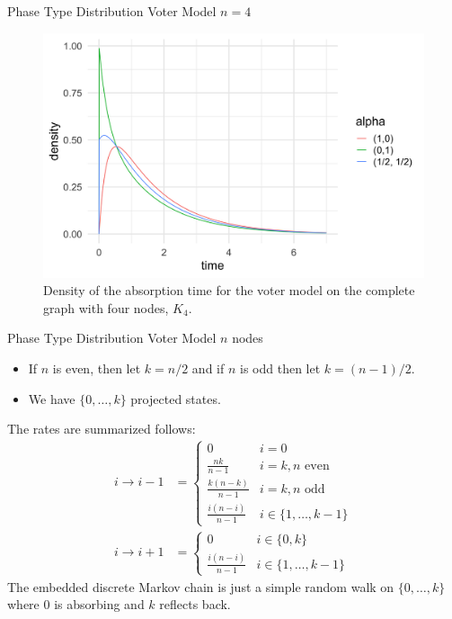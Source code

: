 \documentclass{beamer}
\theoremstyle{definition}
\begin{document}
\begin{frame}{Phase Type Distribution Voter Model $n = 4$}
    \begin{figure}[H]
  \centering
    \includegraphics[width=.9\textwidth]{figures/voter_density_c4.png}
   \caption{Density of the absorption time for the voter model on the complete graph with four nodes, $K_4$.}
  \label{fig:voter_density_c4}
\end{figure}
\end{frame}

\begin{frame}{Phase Type Distribution Voter Model $n$ nodes}
    \begin{itemize}
        \item If $n$ is even, then let $k = n / 2$ and if $n$ is odd then let $k = (n - 1)/2$.
        \item We have $\{0,\ldots, k\}$ projected states.
    \end{itemize}

The rates are summarized follows:
\begin{align*}
    i \to i - 1 &= \begin{cases}
        0 & i = 0\\
        \frac{nk}{n - 1}  & i = k, n \text{ even}\\
        \frac{k (n - k)}{n - 1} & i = k, n \text{ odd}\\
        \frac{i (n - i)}{n - 1}  & i \in \{1,\ldots, k - 1\}
    \end{cases}\\
    i \to i + 1 &= \begin{cases}
        0 & i \in \{0, k\}\\
        \frac{i (n - i)}{n - 1}  & i \in \{1,\ldots, k - 1\}
    \end{cases}
\end{align*}
The embedded discrete Markov chain is just a simple random walk on $\{0,\ldots, k\}$ where 0 is absorbing and $k$ reflects back.
\end{frame}
\end{document}
